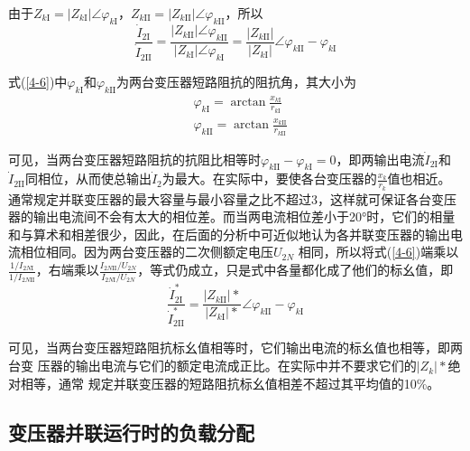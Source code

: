 \documentclass{book}
\begin{document}
由于${{Z}_{k\text{I}}}=\left| {{Z}_{k\text{I}}} \right|\angle {{\varphi }_{k\text{I}}}$，${{Z}_{k\text{II}}}=\left| {{Z}_{k\text{II}}} \right|\angle {{\varphi }_{k\text{II}}}$，所以
\begin{equation}
\frac{{{{\dot{I}}}_{2\text{I}}}}{{{{\dot{I}}}_{2\text{II}}}}=\frac{\left| {{Z}_{k\text{II}}} \right|\angle {{\varphi }_{k\text{II}}}}{\left| {{Z}_{k\text{I}}} \right|\angle {{\varphi }_{k\text{I}}}}=\frac{\left| {{Z}_{k\text{II}}} \right|}{\left| {{Z}_{k\text{I}}} \right|}\angle {{\varphi }_{k\text{II}}}-{{\varphi }_{k\text{I}}}
\label{4-6}
\end{equation}

式(\ref{4-6})中${{\varphi }_{k\text{I}}}$和${{\varphi }_{k\text{II}}}$为两台变压器短路阻抗的阻抗角，其大小为
\begin{align}
& {{\varphi }_{k\text{I}}}=\arctan \frac{{{x}_{k\text{I}}}}{{{r}_{k\text{I}}}} \\ 
& {{\varphi }_{k\text{II}}}=\arctan \frac{{{x}_{k\text{II}}}}{{{r}_{k\text{II}}}}
\end{align}

可见，当两台变压器短路阻抗的抗阻比相等时${{\varphi }_{k\text{II}}}-{{\varphi }_{k\text{I}}}=0$，即两输出电流${{\dot{I}}_{2\text{I}}}$和${{\dot{I}}_{2\text{II}}}$同相位，从而使总输出${{\dot{I}}_{2}}$为最大。在实际中，要使各台变压器的$\frac{{{x}_{k}}}{{{r}_{k}}}$值也相近。通常规定并联变压器的最大容量与最小容量之比不超过3，这样就可保证各台变压器的输出电流间不会有太大的相位差。而当两电流相位差小于20°时，它们的相量和与算术和相差很少，因此，在后面的分析中可近似地认为各并联变压器的输出电流相位相同。因为两台变压器的二次侧额定电压${{U}_{2N}}$ 相同，所以将式(\ref{4-6})端乘以$\frac{1/{{I}_{2N\text{I}}}}{1/{{I}_{2N\text{II}}}}$，右端乘以$\frac{{{I}_{2N\text{II}}}/{{U}_{2N}}}{{{I}_{2N\text{I}}}/{{U}_{2N}}}$，等式仍成立，只是式中各量都化成了他们的标幺值，即
\begin{equation}
\frac{\dot{I}_{2\text{I}}^{*}}{\dot{I}_{2\text{II}}^{*}}=\frac{\left| Z_{k\text{II}}^{{}} \right|*}{\left| Z_{k\text{I}}^{{}} \right|*}\angle {{\varphi }_{k\text{II}}}-{{\varphi }_{k\text{I}}}
\label{4-8}
\end{equation}


可见，当两台变压器短路阻抗标幺值相等时，它们输出电流的标幺值也相等，即两台变 压器的输出电流与它们的额定电流成正比。在实际中并不要求它们的$\left| Z_{k}^{{}} \right|*$绝对相等，通常 规定并联变压器的短路阻抗标幺值相差不超过其平均值的10\%。



\subsection{变压器并联运行时的负载分配}
\end{document}
